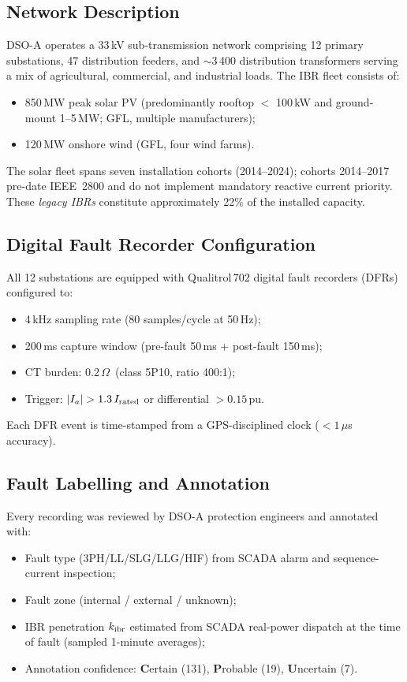 \documentclass[journal]{IEEEtran}
\newcommand{\kibr}{k_{\rm ibr}}
\begin{document}
\subsection{Network Description}

DSO-A operates a 33\,kV sub-transmission network comprising 12 primary
substations, 47 distribution feeders, and $\sim$3\,400 distribution
transformers serving a mix of agricultural, commercial, and industrial
loads.  The IBR fleet consists of:
\begin{itemize}
  \item 850\,MW peak solar PV (predominantly rooftop $<$ 100\,kW and
        ground-mount 1--5\,MW; GFL, multiple manufacturers);
  \item 120\,MW onshore wind (GFL, four wind farms).
\end{itemize}
The solar fleet spans seven installation cohorts (2014--2024);
cohorts 2014--2017 pre-date IEEE~2800 and do not implement mandatory
reactive current priority.  These \emph{legacy IBRs} constitute
approximately 22\% of the installed capacity.

\subsection{Digital Fault Recorder Configuration}

All 12 substations are equipped with Qualitrol\,702 digital fault
recorders (DFRs) configured to:
\begin{itemize}
  \item 4\,kHz sampling rate (80 samples/cycle at 50\,Hz);
  \item 200\,ms capture window (pre-fault 50\,ms + post-fault 150\,ms);
  \item CT burden: 0.2\,$\Omega$\ (class 5P10, ratio 400:1);
  \item Trigger: $|I_a| > 1.3\,I_{\rm rated}$ or differential $> 0.15$\,pu.
\end{itemize}
Each DFR event is time-stamped from a GPS-disciplined clock
($< 1\,\mu$s accuracy).

\subsection{Fault Labelling and Annotation}

Every recording was reviewed by DSO-A protection engineers and annotated
with:
\begin{itemize}
  \item Fault type (3PH/LL/SLG/LLG/HIF) from SCADA alarm and
        sequence-current inspection;
  \item Fault zone (internal / external / unknown);
  \item IBR penetration $\kibr$ estimated from SCADA real-power dispatch
        at the time of fault (sampled 1-minute averages);
  \item Annotation confidence: \textbf{C}ertain (131), \textbf{P}robable (19),
        \textbf{U}ncertain (7).
\end{itemize}
\end{document}
